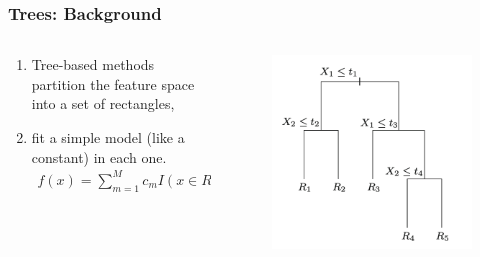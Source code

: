 \documentclass[
  shownotes,
  xcolor={svgnames},
  hyperref={colorlinks,citecolor=DarkBlue,linkcolor=DarkRed,urlcolor=DarkBlue}
  ]{beamer}
\begin{document}
\begin{frame}[fragile]
\frametitle{Trees: Background}


\begin{columns}[T] %
\begin{column}{.42\textwidth}
  
\begin{enumerate}
\item Tree-based methods partition the feature space into a set of rectangles,
\item  fit a simple model (like a constant) in each one. 
\begin{align}
f(x) = \sum_{m=1}^M c_m I(x\in R_m)
\end{align}
\end{enumerate}


\end{column}  
\hfill
\begin{column}{.48\textwidth}

 \begin{figure}[H] \centering
            \captionsetup{justification=centering}
              \includegraphics[scale=0.6]{figures/cart_tree}                           
 \end{figure}

\end{column}
\end{columns}


\end{frame}
\end{document}
